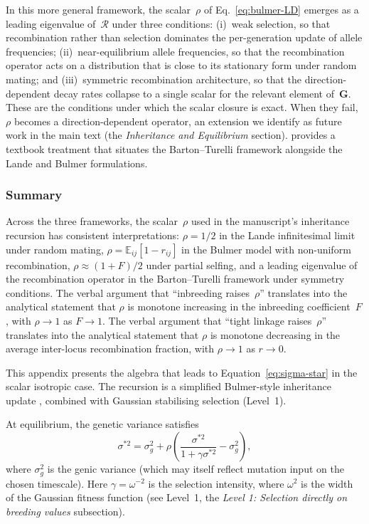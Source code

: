 \documentclass[9pt,twocolumn,twoside,lineno]{gsajnl}
\newcommand{\mat}[1]{\mathbf{#1}}
\begin{document}
In this more general framework, the scalar~$\rho$ of Eq.~\ref{eq:bulmer-LD} emerges as a leading eigenvalue of~$\mathcal{R}$ under three conditions: (i)~weak selection, so that recombination rather than selection dominates the per-generation update of allele frequencies; (ii)~near-equilibrium allele frequencies, so that the recombination operator acts on a distribution that is close to its stationary form under random mating; and (iii)~symmetric recombination architecture, so that the direction-dependent decay rates collapse to a single scalar for the relevant element of~$\mat{G}$. These are the conditions under which the scalar closure is exact. When they fail, $\rho$ becomes a direction-dependent operator, an extension we identify as future work in the main text (the \textit{Inheritance and Equilibrium} section). \citet{Burger2000} provides a textbook treatment that situates the Barton--Turelli framework alongside the Lande and Bulmer formulations.

\subsubsection{Summary}

Across the three frameworks, the scalar~$\rho$ used in the manuscript's inheritance recursion has consistent interpretations: $\rho = 1/2$ in the Lande infinitesimal limit under random mating, $\rho = \mathbb{E}_{ij}[1 - r_{ij}]$ in the Bulmer model with non-uniform recombination, $\rho \approx (1+F)/2$ under partial selfing, and a leading eigenvalue of the recombination operator in the Barton--Turelli framework under symmetry conditions. The verbal argument that ``inbreeding raises~$\rho$'' translates into the analytical statement that $\rho$ is monotone increasing in the inbreeding coefficient~$F$, with $\rho \to 1$ as $F \to 1$. The verbal argument that ``tight linkage raises~$\rho$'' translates into the analytical statement that $\rho$ is monotone decreasing in the average inter-locus recombination fraction, with $\rho \to 1$ as $r \to 0$.


This appendix presents the algebra that leads to Equation~\eqref{eq:sigma-star} in the scalar isotropic case. The recursion is a simplified Bulmer-style inheritance update \citep{Bulmer1971, BartonTurelli1991}, combined with Gaussian stabilising selection (Level~1).

At equilibrium, the genetic variance satisfies
\[
\sigma^{*2} = \sigma^2_g + \rho\left(\frac{\sigma^{*2}}{1 + \gamma \sigma^{*2}} - \sigma^2_g\right),
\]
where $\sigma^2_g$ is the genic variance (which may itself reflect mutation input on the chosen timescale). Here $\gamma = \omega^{-2}$ is the selection intensity, where $\omega^2$ is the width of the Gaussian fitness function (see Level~1, the \textit{Level 1: Selection directly on breeding values} subsection).
\end{document}
